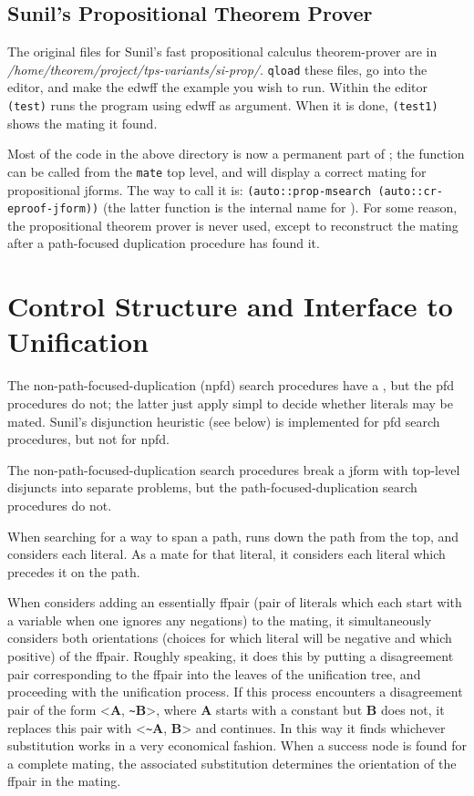 \subsection{Sunil's Propositional Theorem Prover}

The original files for Sunil's fast propositional calculus theorem-prover
are in \\
{\it /home/theorem/project/tps-variants/si-prop/}. {\tt qload} these files, go into the
editor, and make the edwff the example you wish to run. Within the editor
{\tt (test)} runs the program using edwff as argument. When it is done,
{\tt (test1)} shows the mating it found.

Most of the code in the above directory is now a permanent part of \TPS;
the function  can be called from the {\tt mate} top 
level, and will display a correct mating for propositional jforms. The 
way to call it is: {\tt (auto::prop-msearch (auto::cr-eproof-jform))} (the latter
function is the internal name for ). For some reason, 
the propositional theorem prover is never used, except to reconstruct the 
mating after a path-focused duplication procedure has found it.

\section{Control Structure and Interface to Unification}

The non-path-focused-duplication (npfd) search procedures have
a , but the pfd procedures do not; the latter just
apply simpl to decide whether literals may be mated.
Sunil's disjunction heuristic (see below) is implemented for pfd search
procedures, but not for npfd.

The non-path-focused-duplication search procedures break a
jform with top-level disjuncts into separate problems, but the
path-focused-duplication search procedures do not.

When searching for a way to span a path, \TPS runs down the path
from the top, and considers each literal. As a mate for that literal, it
considers each literal which precedes it on the path.

When \TPS considers adding an essentially ffpair (pair of
literals which each start with a variable when one ignores any
negations) to the mating, it simultaneously considers both
orientations (choices for which literal will be negative and which
positive) of the ffpair.  Roughly speaking, it does this by putting a
disagreement pair corresponding to the ffpair into the leaves of the
unification tree, and proceeding with the unification process.  If
this process encounters a disagreement pair of the form <{\bf A},
\verb+~+{\bf B}>, where {\bf A} starts with a constant but {\bf B} does not, it
replaces this pair with {\w <\verb+~+{\bf A}, {\bf B}>} and continues. In this
way it finds whichever substitution works in a very economical
fashion.  When a success node is found for a complete mating, the
associated substitution determines the orientation of the ffpair in
the mating.

